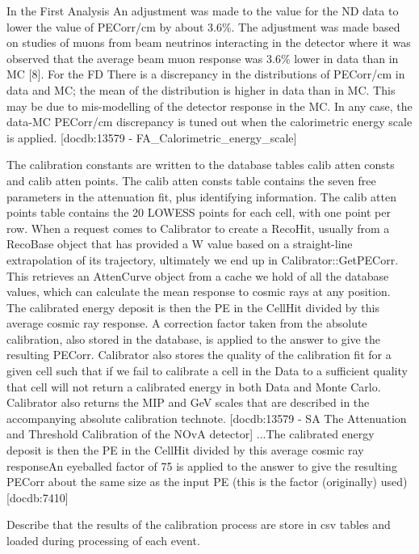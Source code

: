 \documentclass[12pt,a4paper]{article}
\begin{document}
In the First Analysis  An adjustment was made to the value for the ND data to lower the value of PECorr/cm by about 3.6\%. The adjustment was made based on studies of muons from beam neutrinos interacting in the detector where it was observed that the average beam muon response was 3.6\% lower in data than in MC [8]. For the FD There is a discrepancy in the distributions of PECorr/cm in data and MC; the mean of the distribution is higher in data than in MC. This may be due to mis-modelling of the detector response in the MC. In any case, the data-MC PECorr/cm discrepancy is tuned out when the calorimetric energy scale is applied. [docdb:13579 - FA\_Calorimetric\_energy\_scale]

The calibration constants are written to the database tables calib atten consts and calib atten points. The calib atten consts table contains the seven free parameters in the attenuation fit, plus identifying information. The calib atten points table contains the 20 LOWESS points for each cell, with one point per row. When a request comes to Calibrator to create a RecoHit, usually from a RecoBase object that has provided a W value based on a straight-line extrapolation of its trajectory, ultimately we end up in Calibrator::GetPECorr. This retrieves an AttenCurve object from a cache we hold of all the database values, which can calculate the mean response to cosmic rays at any position. The calibrated energy deposit is then the PE in the CellHit divided by this average cosmic ray response. A correction factor taken from the absolute calibration, also stored in the database, is applied to the answer to give the resulting PECorr. Calibrator also stores the quality of the calibration fit for a given cell such that if we fail to calibrate a cell in the Data to a sufficient quality that cell will not return a calibrated energy in both Data and Monte Carlo. Calibrator also returns the MIP and GeV scales that are described in the accompanying absolute calibration technote. [docdb:13579 - SA The Attenuation and Threshold Calibration of the NOvA detector]
...The calibrated energy deposit is then the PE in the CellHit divided by this average cosmic ray responseAn eyeballed factor of 75 is applied to the answer to give the resulting PECorr about the same size as the input PE (this is the factor (originally) used) [docdb:7410]

Describe that the results of the calibration process are store in csv tables and loaded during processing of each event.
\end{document}
